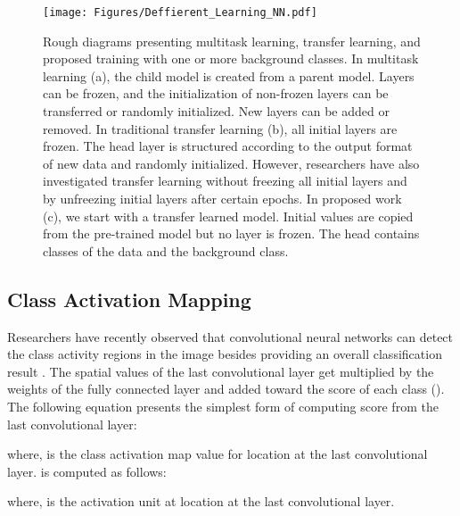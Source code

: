 \documentclass{article}
\begin{document}
\begin{figure*}[ht]
\vskip 0.2in
\begin{center}
\centerline{\texttt{[image: Figures/Deffierent\_Learning\_NN.pdf]}}
\caption{Rough diagrams presenting multitask learning, transfer learning, and proposed training with one or more background classes. In multitask learning (a), the child model is created from a parent model. Layers can be frozen, and the initialization of non-frozen layers can be transferred or randomly initialized. New layers can be added or removed. In traditional transfer learning (b), all initial layers are frozen. The head layer is structured according to the output format of new data and randomly initialized. However, researchers have also investigated transfer learning without freezing all initial layers and by unfreezing initial layers after certain epochs. In proposed work (c), we start with a transfer learned model. Initial values are copied from the pre-trained model but no layer is frozen. The head contains classes of the data and the background class.  }
\label{Chart}
\end{center}
\vskip -0.2in
\end{figure*}



\subsection{Class Activation Mapping}
Researchers have recently observed that convolutional neural networks can detect the class activity regions in the image besides providing an overall classification result \cite{zhou2016learning}. The spatial  values of the last convolutional layer get multiplied by the weights of the fully connected layer and added toward the score of each class (). The following equation presents the simplest form of computing score from the last convolutional layer: 

where,  is the class activation map value for  location at the last convolutional layer.  is computed as follows:

where,  is the activation unit  at  location at the last convolutional layer.
\end{document}
